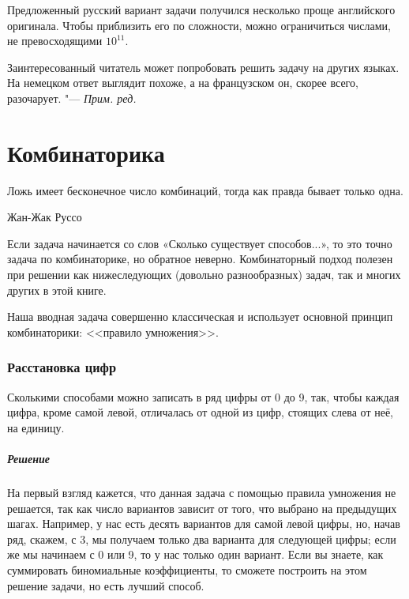 \documentclass[twoside]{book}
\makeatletter
\newcommand{\rindex}[2][\imki@jobname]{%
\index[#1]{\detokenize{#2}}%
}
\newenvironment{addedbytheeditors}{\par\medskip\small
}{\par\addvspace{\medskipamount}} %
\makeatother
\begin{document}
\begin{addedbytheeditors}
Предложенный русский вариант задачи получился несколько проще английского оригинала.
Чтобы приблизить его по сложности, можно ограничиться числами, не превосходящими $10^{11}$.

Заинтересованный читатель может попробовать решить задачу на других языках.
На немецком ответ выглядит похоже, а на французском он, скорее всего, разочарует.
"--- \emph{Прим. ред.} 
\end{addedbytheeditors}


\chapter{Комбинаторика}

\thispagestyle{empty}

\setlength{\epigraphwidth}{.5\textwidth}
\epigraph{Ложь имеет бесконечное число комбинаций,
тогда как правда бывает только одна.\vspace{1ex}}{Жан-Жак Руссо}
 
Если задача начинается со слов «Сколько существует способов...», то
это точно задача по комбинаторике, но обратное
неверно.
Комбинаторный подход  полезен при решении
как нижеследующих (довольно разнообразных) задач, так и многих других
в этой книге.

Наша вводная задача совершенно классическая и использует основной
принцип комбинаторики: <<правило умножения>>.

\subsection*{Расстановка цифр}%
\rindex{Расстановка цифр}

Сколькими способами можно записать в ряд цифры от 0 до 9, так, чтобы
каждая цифра, кроме самой левой, отличалась от одной из цифр, стоящих
слева от неё, на единицу.

\paragraph{Решение} 
На первый взгляд кажется, что данная задача с помощью правила
умножения не решается, так как число вариантов зависит от того, что
выбрано на предыдущих шагах.
Например, у нас есть десять вариантов
для самой левой цифры, но, начав ряд, скажем, с 3, мы получаем только
два варианта для следующей цифры; если же мы начинаем с 0 или 9, то у
нас только один вариант.
Если вы знаете, как суммировать биномиальные
коэффициенты, то сможете построить на этом решение задачи, но есть
лучший способ.
\end{document}
